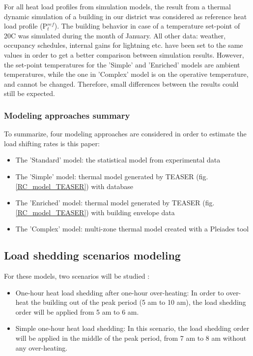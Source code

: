 \documentclass[buildings,article,submit,moreauthors,pdftex,10pt,a4paper]{mdpi}
\theoremstyle{mdpi}
\newcounter{ex}
\newcounter{re}
\theoremstyle{mdpidefinition}
\begin{document}
For all heat load profiles from simulation models, the result from a thermal dynamic simulation of a building in our district was considered as reference heat load profile (P$_{t}^{ref}$). The building behavior in case of a temperature set-point of 20\textdegree{}C was simulated during the month of January. All other data: weather, occupancy schedules, internal gains for lightning etc. have been set to the same values in order to get a better comparison between simulation results.
However, the set-point temperatures for the 'Simple' and 'Enriched' models are ambient temperatures, while the one in 'Complex' model is on the operative temperature, and cannot be changed. Therefore, small differences between the results could still be expected.

\subsubsection{Modeling approaches summary}
To summarize, four modeling approaches are considered in order to estimate the load shifting rates is this paper:
\begin{itemize}[leftmargin=*,labelsep=4mm]
	\item The 'Standard' model: the statistical model from experimental data
	\item The 'Simple' model: thermal model generated by TEASER (fig.\ref{RC_model_TEASER}) with database
	\item The 'Enriched' model: thermal model generated by TEASER (fig.\ref{RC_model_TEASER}) with building envelope data
	\item The 'Complex' model: multi-zone thermal model created with a Pleiades tool
\end{itemize}

\subsection{Load shedding scenarios modeling}

For these models, two scenarios will be studied :
\begin{itemize}[leftmargin=*,labelsep=4mm]
	\item One-hour heat load shedding after one-hour over-heating: In order to over-heat the building out of the peak period (5 am to 10 am), the load shedding order will be applied from 5 am to 6 am.
	\item Simple one-hour heat load shedding: In this scenario, the load shedding order will be applied in the middle of the peak period, from 7 am to 8 am without any over-heating.
\end{itemize}
\end{document}
